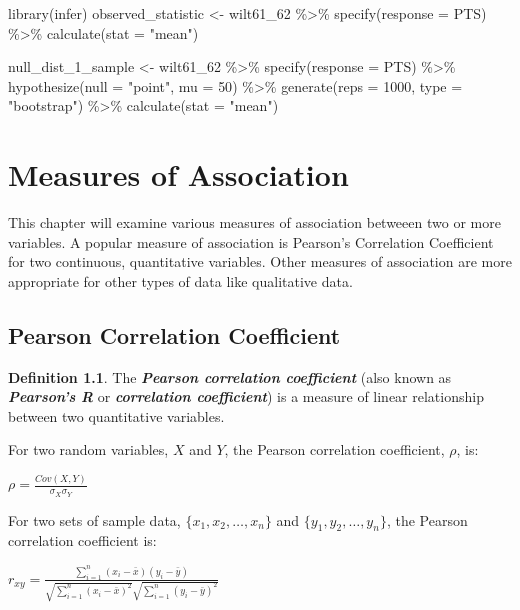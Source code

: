 \documentclass[
  11pt,
]{book}
\newenvironment{Shaded}{\begin{snugshade}}{\end{snugshade}}
\newcommand{\AttributeTok}[1]{\textcolor[rgb]{0.77,0.63,0.00}{#1}}
\newcommand{\DecValTok}[1]{\textcolor[rgb]{0.00,0.00,0.81}{#1}}
\newcommand{\FunctionTok}[1]{\textcolor[rgb]{0.00,0.00,0.00}{#1}}
\newcommand{\NormalTok}[1]{#1}
\newcommand{\OtherTok}[1]{\textcolor[rgb]{0.56,0.35,0.01}{#1}}
\newcommand{\SpecialCharTok}[1]{\textcolor[rgb]{0.00,0.00,0.00}{#1}}
\newcommand{\StringTok}[1]{\textcolor[rgb]{0.31,0.60,0.02}{#1}}
\theoremstyle{definition}
\newtheorem{definition}{Definition}[chapter]
\theoremstyle{definition}
\theoremstyle{definition}
\theoremstyle{definition}
\theoremstyle{remark}
\begin{document}
\begin{Shaded}
\begin{Highlighting}[]
\FunctionTok{library}\NormalTok{(infer)}
\NormalTok{observed\_statistic }\OtherTok{\textless{}{-}}\NormalTok{ wilt61\_62 }\SpecialCharTok{\%\textgreater{}\%}
  \FunctionTok{specify}\NormalTok{(}\AttributeTok{response =}\NormalTok{ PTS) }\SpecialCharTok{\%\textgreater{}\%}
  \FunctionTok{calculate}\NormalTok{(}\AttributeTok{stat =} \StringTok{"mean"}\NormalTok{)}

\NormalTok{null\_dist\_1\_sample }\OtherTok{\textless{}{-}}\NormalTok{ wilt61\_62 }\SpecialCharTok{\%\textgreater{}\%}
  \FunctionTok{specify}\NormalTok{(}\AttributeTok{response =}\NormalTok{ PTS) }\SpecialCharTok{\%\textgreater{}\%}
  \FunctionTok{hypothesize}\NormalTok{(}\AttributeTok{null =} \StringTok{"point"}\NormalTok{, }\AttributeTok{mu =} \DecValTok{50}\NormalTok{) }\SpecialCharTok{\%\textgreater{}\%}
  \FunctionTok{generate}\NormalTok{(}\AttributeTok{reps =} \DecValTok{1000}\NormalTok{, }\AttributeTok{type =} \StringTok{"bootstrap"}\NormalTok{) }\SpecialCharTok{\%\textgreater{}\%}
  \FunctionTok{calculate}\NormalTok{(}\AttributeTok{stat =} \StringTok{"mean"}\NormalTok{)}
\end{Highlighting}
\end{Shaded}

\hypertarget{measures-of-association}{%
\chapter{Measures of Association}\label{measures-of-association}}

This chapter will examine various measures of association betweeen two or more variables. A popular measure of association is Pearson's Correlation Coefficient for two continuous, quantitative variables. Other measures of association are more appropriate for other types of data like qualitative data.

\hypertarget{pearson-correlation-coefficient}{%
\section{Pearson Correlation Coefficient}\label{pearson-correlation-coefficient}}

\begin{definition}
The \textbf{\emph{Pearson correlation coefficient}} (also known as \textbf{\emph{Pearson's R}} or \textbf{\emph{correlation coefficient}}) is a measure of linear relationship between two quantitative variables.

For two random variables, \(X\) and \(Y\), the Pearson correlation coefficient, \(\rho\), is:

\(\rho = \frac{Cov(X,Y)}{\sigma_X \sigma_Y}\)

For two sets of sample data, \(\{x_1,x_2,\ldots,x_n\}\) and \(\{y_1,y_2,\ldots,y_n\}\), the Pearson correlation coefficient is:

\(r_{xy} = \frac{\sum_{i=1}^n (x_i-\bar{x})(y_i-\bar{y})}{\sqrt{\sum_{i=1}^n(x_i-\bar{x})^2}\sqrt{\sum_{i=1}^n(y_i-\bar{y})^2}}\)
\end{definition}
\end{document}
